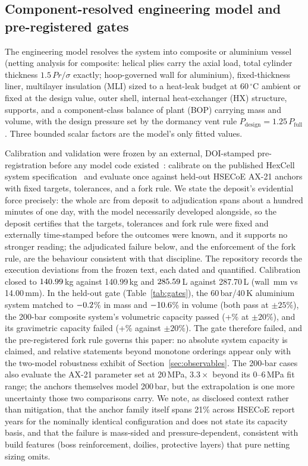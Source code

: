 \documentclass[preprint,12pt]{elsarticle}
\begin{document}
\subsection{Component-resolved engineering model and pre-registered gates}
\label{sec:gates}

The engineering model resolves the system into composite or aluminium
vessel (netting analysis for composite: helical plies carry the axial load,
total cylinder thickness $1.5\,P r/\sigma$ exactly; hoop-governed wall for
aluminium), fixed-thickness liner, multilayer insulation (MLI) sized to a
heat-leak budget at 60\,$^\circ$C ambient or fixed at the design value,
outer shell, internal heat-exchanger (HX) structure, supports, and a
component-class balance of plant (BOP) carrying mass and volume, with the design
pressure set by the dormancy vent rule $P_\mathrm{design}=1.25\,P_\mathrm{full}$
\cite{ahluwalia2009,tamburello2017,purewal2019}. Three bounded scalar
factors are the model's only fitted values.

Calibration and validation were frozen by an external, DOI-stamped
pre-registration before any model code existed~\cite{prereg}: calibrate on
the published HexCell system specification~\cite{tamburello2017} and
evaluate once against held-out HSECoE AX-21 anchors with fixed targets,
tolerances, and a fork rule. We state the deposit's evidential force
precisely: the whole arc from deposit to adjudication spans about a hundred
minutes of one day, with the model necessarily developed alongside, so the
deposit certifies that the targets, tolerances and fork rule were fixed and
externally time-stamped before the outcomes were known, and it supports no
stronger reading; the adjudicated failure below, and the enforcement of the
fork rule, are the behaviour consistent with that discipline.
The repository records the execution deviations from the frozen text, each
dated and quantified. Calibration closed to $140.99$\,kg against
140.99\,kg and $285.59$\,L against 287.70\,L (wall \vEOneTwall\,mm vs
14.00\,mm). In the held-out gate (Table~\ref{tab:gates}), the
60\,bar/40\,K aluminium system matched to
$-0.2$\% in mass and $-10.6$\% in volume (both pass at
$\pm25\%$), the 200-bar composite system's volumetric capacity passed
(+\vEtwoVCdev\% at $\pm20\%$), and its gravimetric capacity failed
(+\vEtwoGCdev\% against $\pm20\%$). The gate therefore failed, and
the pre-registered fork rule governs this paper: no absolute system capacity
is claimed, and relative statements beyond monotone orderings appear only with
the two-model robustness exhibit of Section~\ref{sec:observables}. The
200-bar cases also evaluate the AX-21 parameter set at 20\,MPa,
$3.3\times$ beyond its 0--6\,MPa fit range; the anchors themselves model
200\,bar, but the extrapolation is one more uncertainty those two
comparisons carry. We note, as disclosed context rather than mitigation,
that the anchor family itself spans 21\% across HSECoE report years for the
nominally identical configuration and does not state its capacity basis, and that
the failure is mass-sided and pressure-dependent, consistent with build
features (boss reinforcement, doilies, protective layers) that pure netting
sizing omits.
\end{document}
